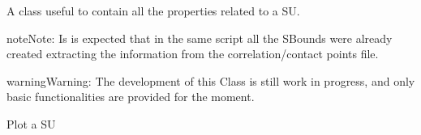 \documentclass[letterpaper,10pt,english]{sphinxmanual}
\begin{document}

\begin{fulllineitems}
\label{\detokenize{hiegeo:hiegeo.SUnit}}
A class useful to contain all the properties related to a SU.

\begin{sphinxadmonition}{note}{Note:}
Is is expected that in the same script all the SBounds were already 
created extracting the information from the correlation/contact points file.
\end{sphinxadmonition}

\begin{sphinxadmonition}{warning}{Warning:}
The development of this Class is still work in progress, and only
basic functionalities are provided for the moment.
\end{sphinxadmonition}

\begin{fulllineitems}
\label{\detokenize{hiegeo:hiegeo.SUnit.plot}}
Plot a SU

\end{fulllineitems}


\end{fulllineitems}

\end{document}
